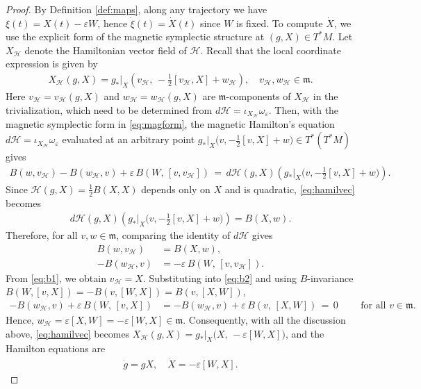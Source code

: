 \documentclass[11pt]{amsart}
\theoremstyle{definition}
\theoremstyle{plain}
\theoremstyle{conclusion}
\begin{document}
\begin{proof}
By Definition \ref{def:maps}, along any trajectory we have $\xi(t)=X(t)-\varepsilon W$, hence $\dot\xi(t)=\dot X(t)$ since $W$ is fixed. To compute $\dot{X}$, we use the explicit form of the magnetic symplectic structure at $(g,X)\in T^*M$. Let $X_\mathcal{H}$ denote the Hamiltonian vector field of $\mathcal{H}$. Recall that the local coordinate expression is given by \begin{align}
X_\mathcal{H}(g,X)=g_*\vert_X\left(v_\mathcal{H},\,-\frac{1}{2}[v_\mathcal{H},X]+w_\mathcal{H}\right),\quad v_\mathcal{H},w_\mathcal{H}\in\mathfrak{m}. \label{eq:hamilvec}
\end{align} Here $v_\mathcal{H} =v_\mathcal{H}(g,X)$ and $w_\mathcal{H} = w_\mathcal{H}(g,X)$ are $\mathfrak{m}$-components of $X_\mathcal{H}$ in the trivialization, which need to be determined from $d \mathcal{H} = \iota_{X_\mathcal{H}}\omega_\varepsilon$. Then, with the magnetic symplectic form in \eqref{eq:magform}, the magnetic Hamilton’s equation $d \mathcal{H} =\iota_{X_\mathcal{H}}\omega_\varepsilon$ evaluated at an arbitrary point $g_*\vert_X\bigl(v,-\frac{1}{2}[v,X]+w\bigr) \in T^*(T^*M)$ gives
\begin{align}
B(w,v_\mathcal{H})-B(w_\mathcal{H},v)+\varepsilon\,B\left(W,\,[v,v_\mathcal{H}]\right)\,=\,d\mathcal{H}(g,X)\left(g_*\vert_X\bigl(v,-\frac{1}{2}[v,X]+w\bigr)\right). \label{eq:hamiltonian01}
\end{align} Since $\mathcal{H}(g,X)=\frac{1}{2} B(X,X)$ depends only on $X$ and is quadratic, \eqref{eq:hamilvec} becomes   \begin{align*}
d\mathcal{H}(g,X)\left(g_*\vert_X\bigl(v,-\frac{1}{2}[v,X]+w\bigr)\right)=B(X,w).
\end{align*} Therefore, for all $v,w\in\mathfrak{m}$, comparing the identity of $d\mathcal{H}$ gives \begin{align}
B(w,v_\mathcal{H})&=B(X,w), \label{eq:b1}\\
-B(w_\mathcal{H},v)&=-\varepsilon\,B\left(W,\,[v,v_\mathcal{H}]\right). \label{eq:b2}
\end{align} From \eqref{eq:b1}, we obtain $v_\mathcal{H}=X$. Substituting into \eqref{eq:b2} and using $B$-invariance $B(W,[v,X]) = -B(v,[W,X]) = B(v,[X,W])$, \begin{align*}
-B(w_\mathcal{H},v)+\varepsilon\,B\left(W,\,[v,X]\right) &= -B(w_\mathcal{H},v)+\varepsilon\,B\left(v,\,[X,W]\right) \,=\,0\qquad \text{ for all } v\in\mathfrak{m}.
\end{align*} Hence,  $w_\mathcal{H}=\varepsilon[X,W]=-\varepsilon[W,X]\in\mathfrak{m}$.  Consequently, with all the discussion above, \eqref{eq:hamilvec} becomes $X_\mathcal{H}(g,X)=g_*\vert_X\bigl(X,\,-\varepsilon[W,X]\bigr)$, and the Hamilton equations are \begin{align}
\dot{g}=gX,\quad \dot{X}=-\varepsilon[W,X]. \label{eq:hamilton}
\end{align}


\end{proof}
\end{document}
